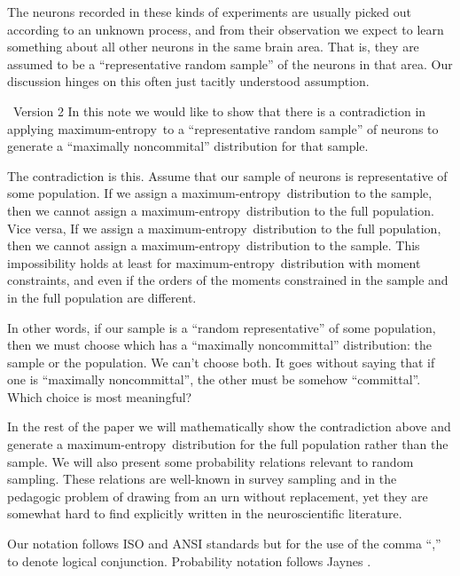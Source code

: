 \documentclass{article}
\theoremstyle{remark}
\theoremstyle{innote}
\newcommand*{\citep}{\parencites}
\renewcommand*{\|}{\mathpunct{|}}%
\theoremstyle{simple}
\newcommand*{\puzzle}{{\fontencoding{U}\fontfamily{fontawesometwo}\selectfont\symbol{225}}}
\newcommand{\mynote}[1]{ {\color{notecolour}\puzzle\ #1}}
\newcommand*{\me}{maximum-entropy}
\begin{document}
The neurons recorded in these kinds of experiments are usually picked out
according to an unknown process, and from their observation we expect to
learn something about all other neurons in the same brain area. That is,
they are assumed to be a \enquote{representative random sample} of the
neurons in that area. Our discussion hinges on this often just tacitly
understood assumption.


\mynote{Version 2 }
In this note we would like to show that there is a
contradiction in applying \me\ to a \enquote{representative random sample}
of neurons to generate a \enquote{maximally noncommital} distribution for
that sample.

The contradiction is this. Assume that our sample of neurons is
representative of some population. If we assign a \me\ distribution to the
sample, then we cannot assign a \me\ distribution to the full population.
Vice versa, If we assign a \me\ distribution to the full population, then
we cannot assign a \me\ distribution to the sample. This impossibility
holds at least for \me\ distribution with moment constraints, and even if
the orders of the moments constrained in the sample and in the full
population are different.

In other words, if our sample is a \enquote{random representative} of some
population, then we must choose which has a \enquote{maximally
  noncommittal} distribution: the sample or the population. We can't choose
both. It goes without saying that if one is \enquote{maximally
  noncommittal}, the other must be somehow \enquote{committal}. Which
choice is most meaningful?

In the rest of the paper we will mathematically show the contradiction
above and generate a \me\ distribution for the full population rather than
the sample. We will also present some probability relations relevant to
random sampling. These relations are well-known in survey sampling and in
the pedagogic problem of drawing from an urn without replacement, yet they
are somewhat hard to find explicitly written in the neuroscientific
literature.

Our notation follows ISO and ANSI standards
\citep{iso1993,ieee1993,nist1995} but for the use of the comma \enquote{,}
to denote logical conjunction. Probability notation follows Jaynes
\citep{jaynes1994_r2003}.
\end{document}
